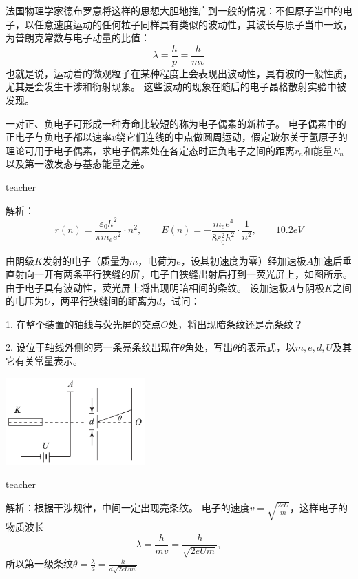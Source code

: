 法国物理学家德布罗意将这样的思想大胆地推广到一般的情况：不但原子当中的电子，以任意速度运动的任何粒子同样具有类似的波动性，其波长与原子当中一致，为普朗克常数与电子动量的比值：
\begin{equation}
\lambda = \frac{h}{p}=\frac{h}{mv}
\end{equation}
也就是说，运动着的微观粒子在某种程度上会表现出波动性，具有波的一般性质，尤其是会发生干涉和衍射现象。
这些波动的现象在随后的电子晶格散射实验中被发现。






\begin{example}

一对正、负电子可形成一种寿命比较短的称为电子偶素的新粒子。
电子偶素中的正电子与负电子都以速率$v$绕它们连线的中点做圆周运动，假定玻尔关于氢原子的理论可用于电子偶素，求电子偶素处在各定态时正负电子之间的距离$r_n$和能量$E_n$以及第一激发态与基态能量之差。

\begin{taggedblock}{teacher}

解析：
\[
r(n)=\frac{\varepsilon_0 h^2}{\pi m_ee^2}\cdot n^2,\qquad E(n)=-\frac{m_ee^4}{8\varepsilon_0^2h^2}\cdot\frac{1}{n^2} ,\qquad 10.2eV
\]

\end{taggedblock}
\end{example}



\begin{example}

由阴级$K$发射的电子（质量为$m$，电荷为$e$，设其初速度为零）经加速极$A$加速后垂直射向一开有两条平行狭缝的屏，电子自狭缝出射后打到一荧光屏上，如图所示。
由于电子具有波动性，荧光屏上将出现明暗相间的条纹。
设加速极$A$与阴极$K$之间的电压为$U$，两平行狭缝间的距离为$d$，试问：

1. 在整个装置的轴线与荧光屏的交点$O$处，将出现暗条纹还是亮条纹？

2. 设位于轴线外侧的第一条亮条纹出现在$\theta$角处，写出$\theta$的表示式，以$m,e,d,U$及其它有关常量表示。
\begin{flushright}
\includegraphics[width = 0.4\textwidth]{images/particle-4.pdf} 
\end{flushright}
\begin{taggedblock}{teacher}

解析：根据干涉规律，中间一定出现亮条纹。
电子的速度$v = \sqrt{\frac{2eU}{m}}$，这样电子的物质波长
\[
\lambda = \frac{h}{mv} = \frac{h}{\sqrt{2eUm}},
\]
所以第一级条纹$\theta = \frac{\lambda}{d} =\frac{h}{d\sqrt{2eUm}} $
\end{taggedblock}
\end{example}


